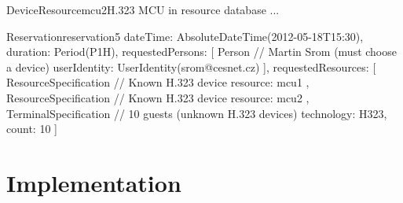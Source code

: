 \begin{enumerate}
\begin{EntityExample}{DeviceResource}{mcu2}{H.323 MCU in resource database}
...
\end{EntityExample}

\begin{EntityExample}{Reservation}{reservation5}{}
dateTime: AbsoluteDateTime(2012-05-18T15:30), duration: Period(P1H),
requestedPersons: [
  Person { // Martin Srom (must choose a device)
    userIdentity: UserIdentity(srom@cesnet.cz)
  }
],
requestedResources: [
  ResourceSpecification { // Known H.323 device
    resource: mcu1
  },
  ResourceSpecification { // Known H.323 device
    resource: mcu2
  },
  TerminalSpecification { // 10 guests (unknown H.323 devices)
    technology: H323,
    count: 10
  }
]
\end{EntityExample}

\end{enumerate}


\section{Implementation}

